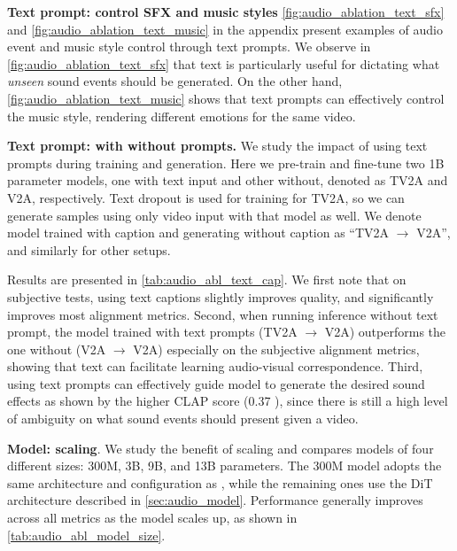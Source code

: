 \textbf{Text prompt: control SFX and music styles}
\cref{fig:audio_ablation_text_sfx} and \cref{fig:audio_ablation_text_music} in the appendix present examples of audio event and music style control through text prompts.
We observe in \cref{fig:audio_ablation_text_sfx} that text is particularly useful for dictating what \textit{unseen} sound events should be generated.
On the other hand, \cref{fig:audio_ablation_text_music} shows that text prompts can effectively control the music style, rendering different emotions for the same video.



\textbf{Text prompt: with \vs without prompts.}
We study the impact of using text prompts during training and generation.
Here we pre-train and fine-tune two 1B parameter models, one with text input and other without, denoted as TV2A and V2A, respectively.
Text dropout is used for training for TV2A, so we can generate samples using only video input with that model as well.
We denote model trained with caption and generating without caption as ``TV2A $\rightarrow$ V2A'', and similarly for other setups.

Results are presented in \cref{tab:audio_abl_text_cap}.
We first note that on subjective tests, using text captions slightly improves quality, and significantly improves most alignment metrics.
Second, when running inference without text prompt, the model trained with text prompts (TV2A $\rightarrow$ V2A) outperforms the one without (V2A $\rightarrow$ V2A) especially on the subjective alignment metrics, showing that text can facilitate learning audio-visual correspondence.
Third, using text prompts can effectively guide model to generate the desired sound effects as shown by the higher CLAP score (0.37 ),
since there is still a high level of ambiguity on what sound events should present given a video.



\textbf{Model: scaling}.
We study the benefit of scaling and compares models of four different sizes: 300M, 3B, 9B, and 13B parameters.
The 300M model adopts the same architecture and configuration as \citet{vyas2023audiobox},
while the remaining ones use the DiT architecture described in \cref{sec:audio_model}.
Performance generally improves across all metrics as the model scales up, as shown in \cref{tab:audio_abl_model_size}.



